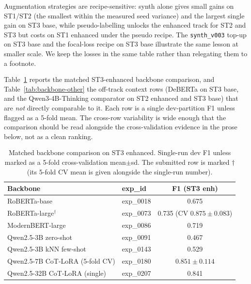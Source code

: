 Augmentation strategies are recipe-sensitive: synth alone gives small gains on ST1/ST2 (the smallest within the measured seed variance) and the largest single gain on ST3 base, while pseudo-labelling unlocks the enhanced track for ST2 and ST3 but costs on ST1 enhanced under the pseudo recipe. The \texttt{synth\_v003} top-up on ST3 base and the focal-loss recipe on ST3 base illustrate the same lesson at smaller scale. We keep the losses in the same table rather than relegating them to a footnote.

Table~\ref{tab:backbone} reports the matched ST3-enhanced backbone comparison, and Table~\ref{tab:backbone-other} the off-track context rows (DeBERTa on ST3 base, and the Qwen3-4B-Thinking comparator on ST2 enhanced and ST3 base) that are \emph{not} directly comparable to it. Each row is a single dev-partition F1 unless flagged as a 5-fold mean. The cross-row variability is wide enough that the comparison should be read alongside the cross-validation evidence in the prose below, not as a clean ranking.

\begin{table}[h]
\centering
\small
\caption{Matched backbone comparison on ST3 enhanced. Single-run dev F1 unless
marked as a 5-fold cross-validation mean$\pm$sd. The submitted row is marked
$\dagger$ (its 5-fold CV mean is given alongside the single-run number).}
\label{tab:backbone}
\begin{tabular}{llc}
\toprule
Backbone & exp\_id & F1 (ST3 enh) \\
\midrule
RoBERTa-base                      & exp\_0018 & 0.675 \\ %
RoBERTa-large$^{\dagger}$         & exp\_0073 & 0.735 \; (CV $0.875 \pm 0.083$) \\ %
ModernBERT-large                  & exp\_0086 & 0.719 \\ %
Qwen2.5-3B zero-shot              & exp\_0091 & 0.467 \\ %
Qwen2.5-3B kNN few-shot           & exp\_0143 & 0.529 \\ %
Qwen2.5-7B CoT-LoRA (5-fold CV)   & exp\_0180 & $0.851 \pm 0.114$ \\ %
Qwen2.5-32B CoT-LoRA (single)     & exp\_0207 & 0.841 \\ %
\bottomrule
\end{tabular}
\end{table}

